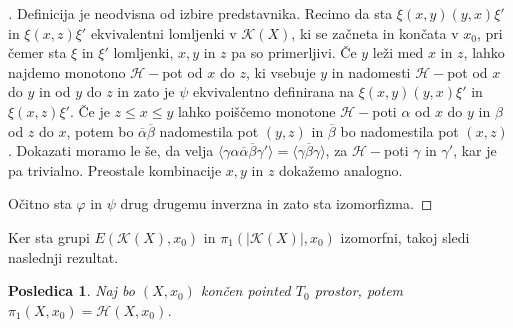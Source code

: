 \documentclass[a4paper,12pt]{article}
\DeclareRobustCommand{\k}{
    \mathcal{K}
}
\DeclareRobustCommand{\h}{
    \mathcal{H}
}
\DeclareRobustCommand{\pot}{
    $\h-$pot
}
\theoremstyle{definition}
\theoremstyle{plain}
\theoremstyle{definition}
\theoremstyle{plain}
\theoremstyle{plain}
\newtheorem{posledica}{Posledica}
\theoremstyle{plain}
\theoremstyle{plain}
\newenvironment{dokaz}{\begin{proof}[\bfseries\upshape\proofname]}{\end{proof}}
\begin{document}
\begin{dokaz}
Definicija je neodvisna od izbire predstavnika. Recimo da sta $\xi(x,y)(y,x)\xi'$ in $\xi(x,z)\xi'$ ekvivalentni lomljenki v $\k(X)$, ki se začneta in končata v $x_0$, pri čemer sta $\xi$ in $\xi'$ lomljenki, $x,y$ in $z$ pa so primerljivi.
Če $y$ leži med $x$ in $z$, lahko najdemo monotono $\mathcal{H}-$pot od $x$ do $z$, ki vsebuje $y$ in nadomesti \pot od $x$ do $y$ in od $y$ do $z$ in zato je $\psi$ ekvivalentno definirana na $\xi(x,y)(y,x)\xi'$ in $\xi(x,z)\xi'$.
Če je $z\leq x \leq y$ lahko poiščemo monotone $\mathcal{H}-$poti $\alpha$ od $x$ do $y$ in $\beta$ od $z$ do $x$, potem bo $\overline{\alpha}\overline{\beta}$ nadomestila pot $(y,z)$ in $\overline{\beta}$ bo nadomestila pot $(x,z)$. Dokazati moramo le še, da velja $\langle\gamma \alpha \overline{\alpha}\overline{\beta}\gamma'\rangle=\langle \gamma\overline{\beta}\gamma\rangle$, za $\h-$poti $\gamma$ in $\gamma'$, kar je pa trivialno. Preostale kombinacije $x,y$ in $z$ dokažemo analogno.

Očitno sta $\varphi$ in $\psi$ drug drugemu inverzna in zato sta izomorfizma.
\end{dokaz}

Ker sta grupi $E(\k(X),x_0)$ in $\pi_1(|\k(X)|,x_0)$ izomorfni, takoj sledi naslednji rezultat.

\begin{posledica}
    Naj bo $(X,x_0)$ končen pointed $T_0$ prostor, potem $\pi_1(X,x_0)=\mathscr{H}(X,x_0)$.
\end{posledica}
\end{document}
